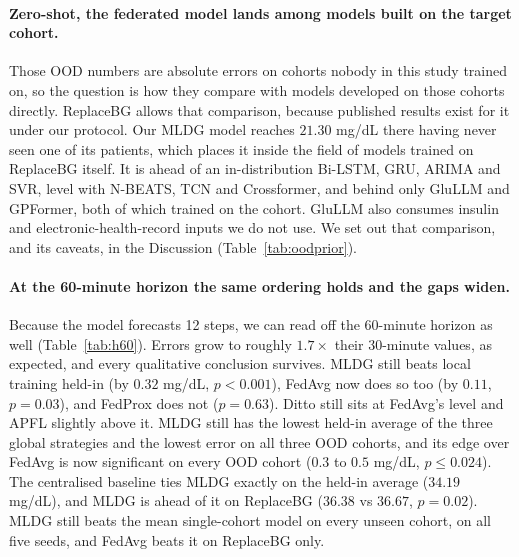 \documentclass[10pt,letterpaper]{article}
\begin{document}
\paragraph{Zero-shot, the federated model lands among models built on the
target cohort.} Those OOD numbers are absolute errors on cohorts nobody in this
study trained on, so the question is how they compare with models developed on
those cohorts directly. ReplaceBG allows that comparison, because published
results exist for it under our protocol. Our MLDG model reaches $21.30$ mg/dL
there having never seen one of its patients, which places it inside the field of
models trained on ReplaceBG itself. It is ahead of an in-distribution Bi-LSTM,
GRU, ARIMA and SVR, level with N-BEATS, TCN and Crossformer, and behind only
GluLLM and GPFormer, both of which trained on the cohort. GluLLM also consumes
insulin and electronic-health-record inputs we do not use. We set out that
comparison, and its caveats, in the Discussion (Table~\ref{tab:oodprior}).

\paragraph{At the 60-minute horizon the same ordering holds and the gaps
widen.} Because the model forecasts 12 steps, we can read off the 60-minute
horizon as well (Table~\ref{tab:h60}). Errors grow to roughly $1.7\times$
their 30-minute values, as expected, and every qualitative conclusion
survives. MLDG still beats local training held-in (by $0.32$ mg/dL,
$p < 0.001$), FedAvg now does so too (by $0.11$, $p = 0.03$), and FedProx
does not ($p = 0.63$). Ditto still sits at FedAvg's
level and APFL slightly above it. MLDG still has the lowest held-in average
of the three global strategies and the lowest error on all three OOD cohorts,
and its edge over FedAvg is now significant on every OOD cohort ($0.3$ to
$0.5$ mg/dL, $p \le 0.024$). The centralised baseline ties MLDG exactly on
the held-in average ($34.19$ mg/dL), and MLDG is ahead of it on ReplaceBG
($36.38$ vs $36.67$, $p = 0.02$). MLDG still beats the mean single-cohort
model on every unseen cohort, on all five seeds, and FedAvg beats it on
ReplaceBG only.
\end{document}
